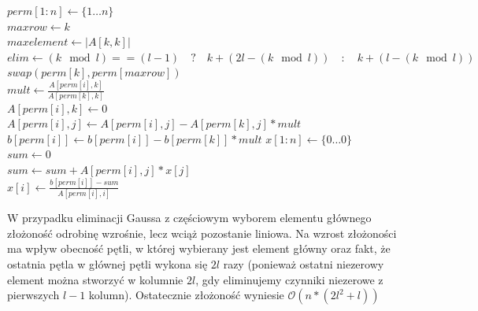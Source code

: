 \documentclass{article}
\begin{document}
\begin{algorithm}[H]
    \DontPrintSemicolon
    \;
    $perm[1:n] \gets \{1 \ldots n\}$\\
     {
        $maxrow \gets k$\\
        $maxelement \gets |A[k,k]|$\\
        $elim \gets (k \mod l) == (l - 1)\quad ? \quad k + (2l - (k \mod l)) \quad : \quad k + (l - (k \mod l))$ \\
         {
        }
        $swap(perm[k],perm[maxrow])$\\
         {
            $mult \gets \frac{A[perm[i],k]}{A[perm[k],k]}$ \\
            $A[perm[i],k] \gets 0$\\
             {
                $A[perm[i],j] \gets A[perm[i],j] - A[perm[k],j] * mult$\\
            }
            $b[perm[i]] \gets b[perm[i]] - b[perm[k]] * mult$
        }
    }
    $x[1:n] \gets \{0 \ldots 0\}$\\
     {
        $sum \gets 0$\\
         {
            $sum \gets sum + A[perm[i],j] * x[j]$\\
        }
        $x[i] \gets \frac{b[perm[i]] - sum}{A[perm[i],i]}$\\
    }
    \;
\end{algorithm}
\quad
\newline
\newline
W przypadku eliminacji Gaussa z częściowym wyborem elementu 
głównego złożoność odrobinę wzrośnie, lecz wciąż pozostanie liniowa. 
Na wzrost złożoności ma wpływ obecność pętli, w której 
wybierany jest element główny oraz fakt, że ostatnia pętla 
w głównej pętli wykona się $2l$ razy (ponieważ ostatni niezerowy element 
można stworzyć w kolumnie $2l$, gdy eliminujemy czynniki niezerowe 
z pierwszych $l-1$ kolumn). Ostatecznie złożoność wyniesie $\mathcal{O}(n*(2l^2+l))$
\end{document}
